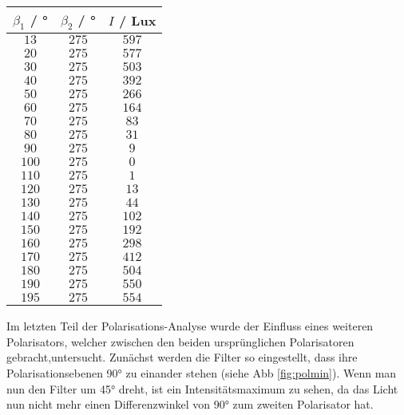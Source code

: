\begin{table}[H]
    \label{tab:pol}
    \centering
    \begin{tabular}{ccc} \hline
    $\beta_1$ / ° & $\beta_2$ / ° & $I$ / Lux \\\hline \hline
    $13$&$275$&$597$\\ \hline
    $20$&$275$&$577$\\ \hline
    $30$&$275$&$503$\\ \hline
    $40$&$275$&$392$\\ \hline
    $50$&$275$&$266$\\ \hline
    $60$&$275$&$164$\\ \hline
    $70$&$275$&$83$\\ \hline
    $80$&$275$&$31$\\ \hline
    $90$&$275$&$9$\\ \hline
    $100$&$275$&$0$\\ \hline
    $110$&$275$& $1$\\ \hline
    $120$&$275$&$13$\\ \hline
    $130$&$275$&$44$\\ \hline
    $140$&$275$&$102$\\ \hline
    $150$&$275$&$192$\\ \hline
    $160$&$275$&$298$\\ \hline
    $170$&$275$&$412$\\ \hline
    $180$&$275$&$504$\\ \hline
    $190$&$275$&$550$\\ \hline
    $195$&$275$&$554$\\ \hline
    \end{tabular}
\end{table}
Im letzten Teil der Polarisations-Analyse wurde der Einfluss eines weiteren Polarisators, welcher zwischen den beiden ursprünglichen Polarisatoren gebracht,untersucht.
Zunächst werden die Filter so eingestellt, dass ihre Polarisationsebenen 90° zu einander stehen (siehe Abb \ref{fig:polmin}).
Wenn man nun den Filter um 45° dreht, ist ein Intensitätsmaximum zu sehen, da das Licht nun nicht mehr einen Differenzwinkel von 90° zum zweiten Polarisator hat.

